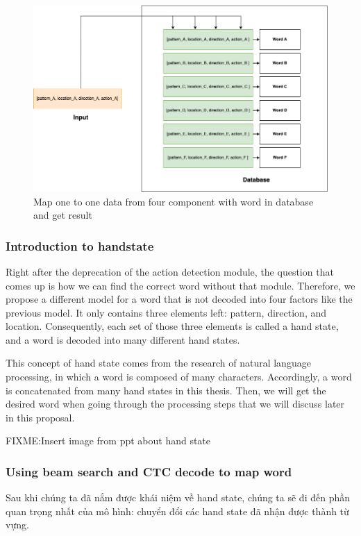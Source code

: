 \begin{figure}[H]
	\centering
	\includegraphics[width=\textwidth]{img/Chap4/MapWord.png}
	\caption{Map one to one data from four component with word in database and get result}
	\label{fig:Chap4-MapWord}
\end{figure}

\subsubsection{ Introduction to handstate }

Right after the deprecation of the action detection module, the question that comes up is how we can find the correct word without that module. Therefore, we propose a different model for a word that is not decoded into four factors like the previous model. It only contains three elements left: pattern, direction, and location. Consequently, each set of those three elements is called a hand state, and a word is decoded into many different hand states.

This concept of hand state comes from the research of natural language processing, in which a word is composed of many characters. Accordingly, a word is concatenated from many hand states in this thesis. Then, we will get the desired word when going through the processing steps that we will discuss later in this proposal.

FIXME:Insert image from ppt about hand state

\subsubsection{ Using beam search and CTC decode to map word}

Sau khi chúng ta đã nắm được khái niệm về hand state, chúng ta sẽ đi đến phần quan trọng
nhất của mô hình: chuyển đổi các hand state đã nhận được thành từ vựng.
      
